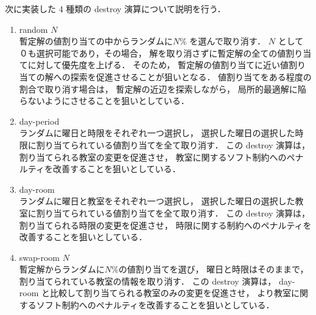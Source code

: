 次に実装した 4 種類の destroy 演算について説明を行う．
    \begin{enumerate}
    \item random $N$\\
       暫定解の値割り当ての中からランダムに$N$\% を選んで取り消す．
       $N$ として０も選択可能であり，その場合，
       解を取り消さずに暫定解の全ての値割り当てに対して優先度を上げる．
       そのため，
       暫定解の値割り当てに近い値割り当ての解への探索を促進させることが狙いとなる．
       値割り当てをある程度の割合で取り消す場合は，
       暫定解の近辺を探索しながら，
       局所的最適解に陥らないようにさせることを狙いとしている．
    \item day-period\\
      ランダムに曜日と時限をそれぞれ一つ選択し，
      選択した曜日の選択した時限に割り当てられている値割り当てを全て取り消す．
      この destroy 演算は，
      割り当てられる教室の変更を促進させ，
      教室に関するソフト制約へのペナルティを改善することを狙いとしている．
  \item day-room\\
   ランダムに曜日と教室をそれぞれ一つ選択し，
   選択した曜日の選択した教室に割り当てられている値割り当てを全て取り消す．
   この destroy 演算は，
   割り当てられる時限の変更を促進させ，
   時限に関する制約へのペナルティを改善することを狙いとしている．
  \item swap-room $N$\\
    暫定解からランダムに$N$\%の値割り当てを選び，
    曜日と時限はそのままで，割り当てられている教室の情報を取り消す．
   この destroy 演算は，
   day-room と比較して割り当てられる教室のみの変更を促進させ，
   より教室に関するソフト制約へのペナルティを改善することを狙いとしている．
    
  \end{enumerate}

